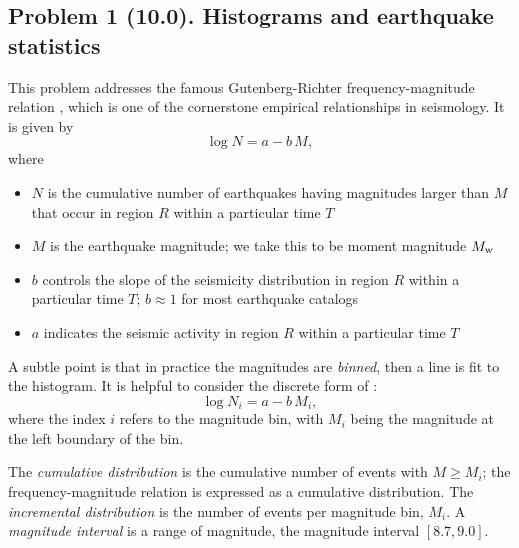 \documentclass[11pt,titlepage,fleqn]{article}
\begin{document}

\subsection*{Problem 1 (10.0). Histograms and earthquake statistics}

This problem addresses the famous Gutenberg-Richter frequency-magnitude relation \citep{GutenbergRichter1944}, which is one of the cornerstone empirical relationships in seismology. It is given by
%
\begin{equation}
\log N = a - b\,M,
\label{GR}
\end{equation}
%
where
%
\begin{itemize}
\item $N$ is the cumulative number of earthquakes having magnitudes larger than $M$ that occur in region $R$ within a particular time $T$
\item $M$ is the earthquake magnitude; we take this to be moment magnitude $M_{\rm w}$
\item $b$ controls the slope of the seismicity distribution in region $R$ within a particular time $T$; $b \approx 1$ for most earthquake catalogs
\item $a$ indicates the seismic activity in region $R$ within a particular time $T$
\end{itemize}
%
A subtle point is that in practice the magnitudes are {\em binned}, then a line is fit to the histogram. It is helpful to consider the discrete form of :
%
\begin{equation}
\log N_i = a - b\,M_i,
\label{GRd}
\end{equation}
%
where the index $i$ refers to the magnitude bin, with $M_i$ being the magnitude at the left boundary of the bin.

The {\em cumulative distribution} is the cumulative number of events with $M \ge M_i$; the frequency-magnitude relation is expressed as a cumulative distribution. The {\em incremental distribution} is the number of events per magnitude bin, $M_i$.  A {\em magnitude interval} is a range of magnitude, \eg the magnitude interval $[8.7,9.0]$.


\end{document}
